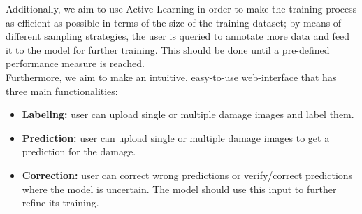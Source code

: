 \documentclass[lang=english,inputenc=utf8,fontsize=10pt]{ldvarticle}
\begin{document}
Additionally, we aim to use Active Learning in order to make the training process as efficient as possible in terms of the size of the training dataset; by means of different sampling strategies, the user is queried to annotate more data and feed it to the model for further training. This should be done until a pre-defined performance measure is reached. \\

Furthermore, we aim to make an intuitive, easy-to-use web-interface that has three main functionalities:
\begin{itemize}
	\item \textbf{Labeling:} user can upload single or multiple damage images and label them.
	\item \textbf{Prediction:} user can upload single or multiple damage images to get a prediction for the damage.
	\item \textbf{Correction:} user can correct wrong predictions or verify/correct predictions where the model is uncertain. The model should use this input to further refine its training.
\end{itemize}
\end{document}
